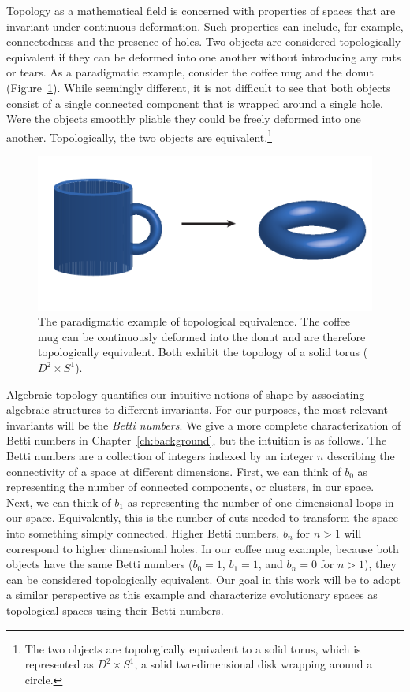 Topology as a mathematical field is concerned with properties of spaces that are invariant under continuous deformation.
Such properties can include, for example, connectedness and the presence of holes.
Two objects are considered topologically equivalent if they can be deformed into one another without introducing any cuts or tears.
As a paradigmatic example, consider the coffee mug and the donut (Figure~\ref{intro:fig:coffeemug_to_donut}).
While seemingly different, it is not difficult to see that both objects consist of a single connected component that is wrapped around a single hole.
Were the objects smoothly pliable they could be freely deformed into one another.
Topologically, the two objects are equivalent.\footnote{The two objects are topologically equivalent to a solid torus, which is represented as $D^2\times S^1$, a solid two-dimensional disk wrapping around a circle.}

\begin{figure}[t]
\centering
\includegraphics[width=\columnwidth]{./fig/introduction/coffeemug_to_donut.pdf}
\caption[Topological equivalence of the coffee mug and the donut]{The paradigmatic example of topological equivalence. The coffee mug can be continuously deformed into the donut and are therefore topologically equivalent. Both exhibit the topology of a solid torus ($D^2\times S^1$).}
\label{intro:fig:coffeemug_to_donut}
\end{figure}

Algebraic topology quantifies our intuitive notions of shape by associating algebraic structures to different invariants.
For our purposes, the most relevant invariants will be the \emph{Betti numbers}.
We give a more complete characterization of Betti numbers in Chapter~\ref{ch:background}, but the intuition is as follows.
The Betti numbers are a collection of integers indexed by an integer $n$ describing the connectivity of a space at different dimensions.
First, we can think of $b_0$ as representing the number of connected components, or clusters, in our space.
Next, we can think of $b_1$ as representing the number of one-dimensional loops in our space.
Equivalently, this is the number of cuts needed to transform the space into something simply connected.
Higher Betti numbers, $b_n$ for $n>1$ will correspond to higher dimensional holes.
In our coffee mug example, because both objects have the same Betti numbers ($b_0=1$, $b_1=1$, and $b_n=0$ for $n>1$), they can be considered topologically equivalent.
Our goal in this work will be to adopt a similar perspective as this example and characterize evolutionary spaces as topological spaces using their Betti numbers.

